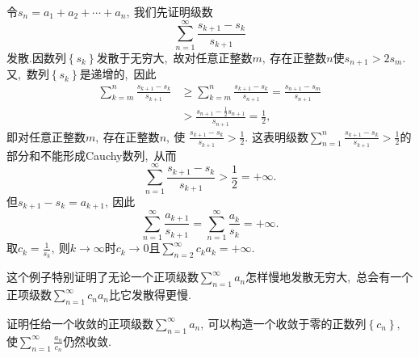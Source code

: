 	\begin{solution}
		令$s_n=a_1+a_2+\cdots+a_n,\ $我们先证明级数
		$$\sum\limits_{n=1}^{\infty}\frac{s_{k+1}-s_k}{s_{k+1}}$$
		发散.因数列$\left\{s_k\right\}$发散于无穷大,\ 故对任意正整数$m,\ $存在正整数$n$使$s_{n+1}>2s_m.$又,\ 数列$\left\{s_k\right\}$是递增的,\ 因此
		\begin{align*}
			\sum\limits_{k=m}^{n}\frac{s_{k+1}-s_k}{s_{k+1}}&\ge\sum\limits_{k=m}^{n}\frac{s_{k+1}-s_k}{s_{n+1}}=\frac{s_{n+1}-s_m}{s_{n+1}}\\
			&>\frac{s_{n+1}-\frac{1}{2}s_{n+1}}{s_{n+1}}=\frac{1}{2},\ 
		\end{align*}
		即对任意正整数$m,\ $存在正整数$n,\ $使
		$\frac{s_{k+1}-s_k}{s_{k+1}}>\frac{1}{2}.$
		这表明级数$\sum\limits_{n=1}^{n}\frac{s_{k+1}-s_k}{s_{k+1}}>\frac{1}{2}$的部分和不能形成Cauchy数列,\ 从而
		$$\sum\limits_{n=1}^{\infty}\frac{s_{k+1}-s_k}{s_{k+1}}>\frac{1}{2}=+\infty.$$
		但$s_{k+1}-s_k=a_{k+1},\ $因此
		$$\sum\limits_{n=1}^{\infty}\frac{a_{k+1}}{s_{k+1}}=\sum\limits_{n=1}^{\infty}\frac{a_k}{s_k}=+\infty.$$
		取$c_k=\frac{1}{s_k},\ $则$k\rightarrow\infty$时$c_k\rightarrow0$且$\sum\limits_{n=2}^{\infty}c_ka_k=+\infty.$\\
		\begin{note}
			这个例子特别证明了无论一个正项级数$\sum\limits_{n=1}^{\infty}a_n$怎样慢地发散无穷大,\ 总会有一个正项级数$\sum\limits_{n=1}^{\infty}c_na_n$比它发散得更慢. 
		\end{note}
	\end{solution}
	\newpage
	\begin{problem}
		证明任给一个收敛的正项级数$\sum\limits_{n=1}^{\infty}a_n,\ $可以构造一个收敛于零的正数列$\left\{c_n\right\},\ $使$\sum\limits_{n=1}^{\infty}\frac{a_n}{c_n}$仍然收敛.
	\end{problem}
	
